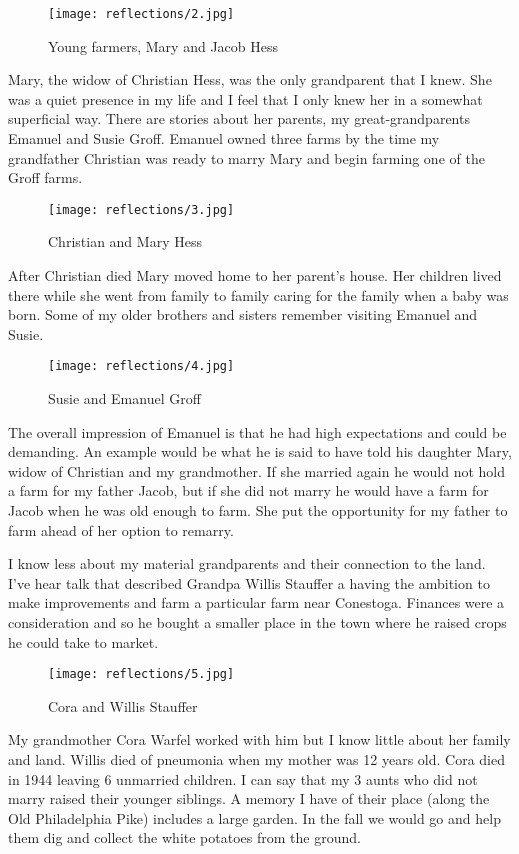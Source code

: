 \begin{figure}
\centering
\texttt{[image: reflections/2.jpg]}
\caption{
Young farmers, Mary and Jacob Hess
}
\end{figure}

Mary, the widow of Christian Hess, was the only grandparent that I knew.
She was a quiet presence in my life and I feel that I only knew her in a somewhat superficial way.
There are stories about her parents, my great-grandparents Emanuel and Susie Groff.
Emanuel owned three farms by the time my grandfather Christian was ready to marry Mary and begin farming one of the Groff farms.

\begin{figure}
\centering
\texttt{[image: reflections/3.jpg]}
\caption{
Christian and Mary Hess
}
\end{figure}
After Christian died Mary moved home to her parent's house.
Her children lived there while she went from family to family caring for the family when a baby was born.
Some of my older brothers and sisters remember visiting Emanuel and Susie.

\begin{figure}
\centering
\texttt{[image: reflections/4.jpg]}
\caption{
Susie and Emanuel Groff
}
\end{figure}

The overall impression of Emanuel is that he had high expectations and could be demanding.
An example would be what he is said to have told his daughter Mary, widow of Christian and my grandmother.
If she married again he would not hold a farm for my father Jacob, but if she did not marry he would have a farm for Jacob when he was old enough to farm.
She put the opportunity for my father to farm ahead of her option to remarry.

I know less about my material grandparents and their connection to the land.
I've hear talk that described Grandpa Willis Stauffer a having the ambition to make improvements and farm a particular farm near Conestoga.
Finances were a consideration and so he bought a smaller place in the town where he raised crops he could take to market.

\begin{figure}
\centering
\texttt{[image: reflections/5.jpg]}
\caption{
Cora and Willis Stauffer
}
\end{figure}
My grandmother Cora Warfel worked with him but I know little about her family and land.
Willis died of pneumonia when my mother was 12 years old.
Cora died in 1944 leaving 6 unmarried children.
I can say that my 3 aunts who did not marry raised their younger siblings.
A memory I have of their place (along the Old Philadelphia Pike) includes a large garden.
In the fall we would go and help them dig and collect the white potatoes from the ground.

